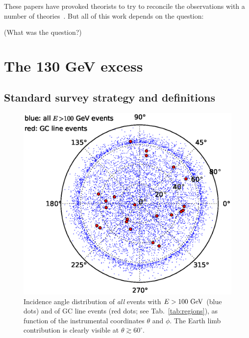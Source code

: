 \documentclass[aps,twocolumn,prd,superscriptaddress,showpacs,nofootinbib,fixfloat]{revtex4}
\newcommand{\GeV}{{\rm ~GeV}}
\begin{document}
These papers have provoked theorists to try to reconcile the
observations with a number of
theories~\citep{Dudas:2012,Choi:2012,Kyae:2012,Lee:2012,Rajaraman:2012,Acharya:2012,Garny:2012,Buckley:2012,Chu:2012,Kang:2012,Buchmuller:2012,Heo:2012,Park:2012,Tulin:2012,Cline:2012,Weiner:2012}.
But all of this work depends on the question:

(What was the question?)


\section{The 130 GeV excess}

\subsection{Standard survey strategy and definitions}

\begin{figure}[h]
  \begin{center}
    \includegraphics[width=0.9\linewidth]{plots/polarCounts.eps}
    \vspace{-0.5cm}
  \end{center}
  \caption{Incidence angle distribution of \emph{all} events with $E>100\GeV$
  (blue dots) and of GC line events (red dots; see
  Tab.~\ref{tab:regions}), as function of the instrumental coordinates
  $\theta$ and $\phi$. The Earth limb contribution is clearly visible
  at $\theta\gtrsim 60^\circ$.}
  \label{fig:phiThetaDist}
\end{figure}
\end{document}
